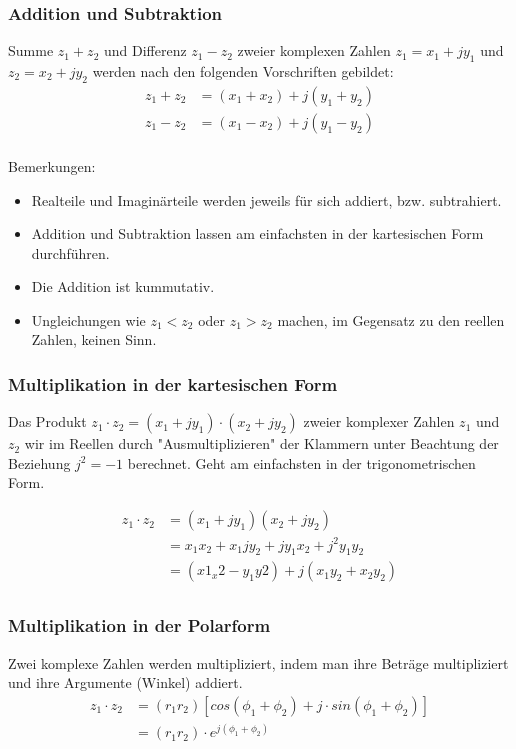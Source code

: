 \subsubsection*{Addition und Subtraktion}
\begin{definition}
Summe $z_1 + z_2$ und Differenz $z_1 - z_2$ zweier komplexen Zahlen $z_1 = x_1 + jy_1$ und $z_2 = x_2 + jy_2$ werden nach den folgenden Vorschriften gebildet:
\begin{align*}
z_1 + z_2 &= (x_1 + x_2) + j(y_1 + y_2)\\
z_1 - z_2 &= (x_1 - x_2) + j(y_1 - y_2)\\
\end{align*}
\end{definition}
Bemerkungen:
\begin{itemize}
	\item Realteile und Imaginärteile werden jeweils für sich addiert, bzw. subtrahiert.
	\item Addition und Subtraktion lassen am einfachsten in der kartesischen Form durchführen.
	\item Die Addition ist kummutativ.
	\item Ungleichungen wie $z_1 < z_2$ oder $z_1>z_2$ machen, im Gegensatz zu den reellen Zahlen, keinen Sinn.
\end{itemize}

\subsubsection*{Multiplikation in der kartesischen Form}
\begin{definition}
Das Produkt $z_1 \cdot z_2 = (x_1 + jy_1) \cdot (x_2 + jy_2)$ zweier komplexer Zahlen $z_1$ und $z_2$ wir im Reellen durch "Ausmultiplizieren" der Klammern unter Beachtung der Beziehung $j^2 = -1$ berechnet. Geht am einfachsten in der trigonometrischen Form.
\end{definition}
\begin{bsp}
\begin{align*}
	z_1 \cdot z_2 	&= (x_1 + jy_1)(x_2 + jy_2) \\
							&= x_1x_2 + x_1jy_2 + jy_1x_2 + j^2y_1y_2\\
							&=(x1_x2 - y_1y2) + j(x_1y_2 + x_2y_2)\\
\end{align*}
\end{bsp}
\subsubsection*{Multiplikation in der Polarform}
\begin{definition}
Zwei komplexe Zahlen werden multipliziert, indem man ihre Beträge multipliziert und ihre Argumente (Winkel) addiert.
\begin{align*}
	z_1 \cdot z_2 	&= (r_1r_2)[cos(\phi_1 +\phi_2) +j \cdot sin(\phi_1 + \phi_2)] \\
							&= (r_1r_2) \cdot e^{j(\phi_1 + \phi_2)}
\end{align*}
\end{definition}

